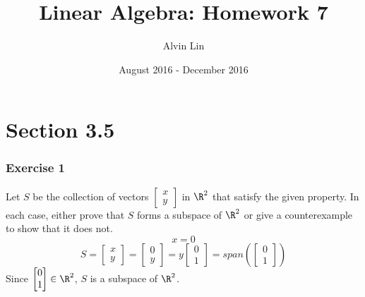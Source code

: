 \documentclass{math}
\title{Linear Algebra: Homework 7}
\author{Alvin Lin}
\date{August 2016 - December 2016}
\begin{document}
\maketitle

\section*{Section 3.5}

\subsubsection*{Exercise 1}
Let \( S \) be the collection of vectors \( \begin{bmatrix}x \\ y\end{bmatrix}
\) in \( \R^2 \) that satisfy the given property. In each case, either prove
that \( S \) forms a subspace of \( \R^2 \) or give a counterexample to show
that it does not.
\[ x = 0 \]
\[ S = \begin{bmatrix}x \\ y\end{bmatrix} =
  \begin{bmatrix}0 \\ y\end{bmatrix} =
  y\begin{bmatrix}0 \\ 1\end{bmatrix} =
  span\left(\begin{bmatrix}0 \\ 1\end{bmatrix}\right) \]
Since \( \begin{bmatrix}0 \\ 1\end{bmatrix}\in\R^2 \), \( S \) is a subspace
of \( \R^2 \).
\end{document}
